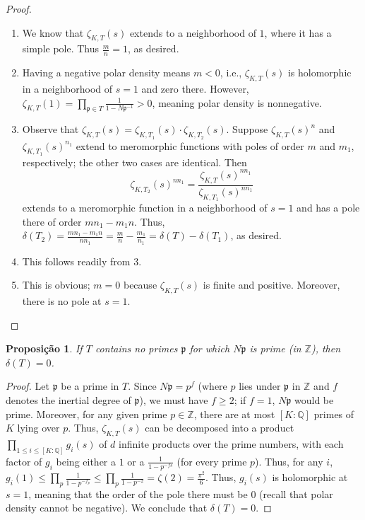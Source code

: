 \documentclass{article}
\newcommand{\QQ}{\mathbb{Q}}
\newcommand{\ZZ}{\mathbb{Z}}
\theoremstyle{plain}
\newtheorem{prop}{Proposição}
\theoremstyle{remark}
\numberwithin{equation}{section}
\numberwithin{thm}{section}
\numberwithin{defn}{section}
\numberwithin{lemma}{section}
\numberwithin{axm}{section}
\begin{document}
\begin{proof}

$ $\\ \vspace{-0.4cm}

\begin{enumerate}

    \item We know that $\zeta_{K, T}(s)$ extends to a neighborhood of $1$, where it has a simple pole. Thus $\frac{m}{n} = 1$, as desired.
    \item Having a negative polar density means $m < 0$, i.e., $\zeta_{K, T}(s)$ is holomorphic in a neighborhood of $s = 1$ and zero there. However, $\zeta_{K, T}(1) = \prod_{\mathfrak{p} \in T} \frac{1}{1 - N\mathfrak{p}^{-1}} > 0$, meaning polar density is nonnegative.
    \item Observe that $\zeta_{K, T}(s) = \zeta_{K, T_1}(s) \cdot \zeta_{K, T_2}(s)$. Suppose $\zeta_{K, T}(s)^{n}$ and $\zeta_{K, T_1}(s)^{n_1}$ extend to meromorphic functions with poles of order $m$ and $m_1$, respectively; the other two cases are identical. Then $$\zeta_{K, T_2}(s)^{nn_1} = \frac{\zeta_{K, T}(s)^{nn_1}}{\zeta_{K, T_1}(s)^{nn_1}}$$ extends to a meromorphic function in a neighborhood of $s = 1$ and has a pole there of order $mn_1 - m_1n$. Thus, $\delta(T_2) = \frac{mn_1 - m_1n}{nn_1} = \frac{m}{n} - \frac{m_1}{n_1} = \delta(T) - \delta(T_1)$, as desired.
    \item This follows readily from 3. 
    \item This is obvious; $m = 0$ because $\zeta_{K, T}(s)$ is finite and positive. Moreover, there is no pole at $s = 1$.
\end{enumerate}

\end{proof}

\begin{prop} \label{4.3}
If $T$ contains no primes $\mathfrak{p}$ for which $N\mathfrak{p}$ is prime (in $\ZZ$), then $\delta(T) = 0$. 
\end{prop}

\begin{proof}
Let $\mathfrak{p}$ be a prime in $T$. Since $N\mathfrak{p} = p^{f}$ (where $p$ lies under $\mathfrak{p}$ in $\ZZ$ and $f$ denotes the inertial degree of $\mathfrak{p}$), we must have $f \geq 2$; if $f = 1$, $N\mathfrak{p}$ would be prime. Moreover, for any given prime $p \in \ZZ$, there are at most $[K : \QQ]$ primes of $K$ lying over $p$. Thus, $\zeta_{K, T}(s)$ can be decomposed into a product $\prod_{1 \leq i \leq [K : \QQ]} g_{i}(s)$ of $d$ infinite products over the prime numbers, with each factor of $g_i$ being either a $1$ or a $\frac{1}{1-p^{-fs}}$ (for every prime $p$). Thus, for any $i$, $g_{i}(1) \leq \prod_{p} \frac{1}{1-p^{-f_{p}}} \leq \prod_{p} \frac{1}{1-p^{-2}} = \zeta(2) = \frac{\pi^2}{6}$. Thus, $g_{i}(s)$ is holomorphic at $s = 1$, meaning that the order of the pole there must be $0$ (recall that polar density cannot be negative). We conclude that $\delta(T) = 0$. 
\end{proof}
\end{document}
